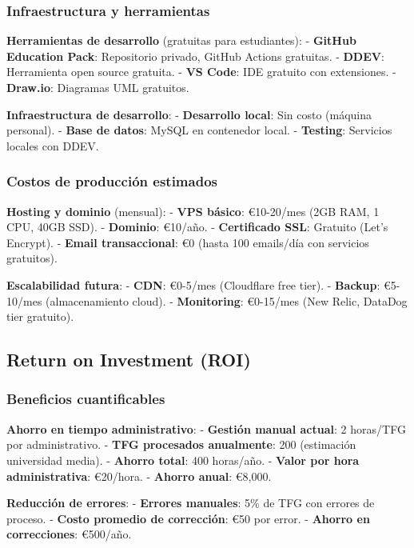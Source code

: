 \documentclass[12pt,a4paper,oneside]{report}
\begin{document}
\subsubsection{Infraestructura y
herramientas}\label{infraestructura-y-herramientas}

\textbf{Herramientas de desarrollo} (gratuitas para estudiantes): -
\textbf{GitHub Education Pack}: Repositorio privado, GitHub Actions
gratuitas. - \textbf{DDEV}: Herramienta open source gratuita. -
\textbf{VS Code}: IDE gratuito con extensiones. - \textbf{Draw.io}:
Diagramas UML gratuitos.

\textbf{Infraestructura de desarrollo}: - \textbf{Desarrollo local}: Sin
costo (máquina personal). - \textbf{Base de datos}: MySQL en contenedor
local. - \textbf{Testing}: Servicios locales con DDEV.

\subsubsection{Costos de producción
estimados}\label{costos-de-producciuxf3n-estimados}

\textbf{Hosting y dominio} (mensual): - \textbf{VPS básico}: €10-20/mes
(2GB RAM, 1 CPU, 40GB SSD). - \textbf{Dominio}: €10/año. -
\textbf{Certificado SSL}: Gratuito (Let's Encrypt). - \textbf{Email
transaccional}: €0 (hasta 100 emails/día con servicios gratuitos).

\textbf{Escalabilidad futura}: - \textbf{CDN}: €0-5/mes (Cloudflare free
tier). - \textbf{Backup}: €5-10/mes (almacenamiento cloud). -
\textbf{Monitoring}: €0-15/mes (New Relic, DataDog tier gratuito).

\subsection{Return on Investment (ROI)}\label{return-on-investment-roi}

\subsubsection{Beneficios
cuantificables}\label{beneficios-cuantificables}

\textbf{Ahorro en tiempo administrativo}: - \textbf{Gestión manual
actual}: 2 horas/TFG por administrativo. - \textbf{TFG procesados
anualmente}: 200 (estimación universidad media). - \textbf{Ahorro
total}: 400 horas/año. - \textbf{Valor por hora administrativa}:
€20/hora. - \textbf{Ahorro anual}: €8,000.

\textbf{Reducción de errores}: - \textbf{Errores manuales}: 5\% de TFG
con errores de proceso. - \textbf{Costo promedio de corrección}: €50 por
error. - \textbf{Ahorro en correcciones}: €500/año.
\end{document}
